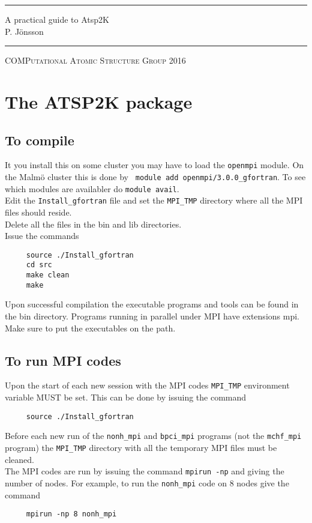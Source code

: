 \documentclass[fleqn,10pt]{book}
\newcommand{\HRule}{\rule{\linewidth}{1mm}}
\begin{document}
\HRule
\begin{flushright}
\huge A practical guide to {\sc Atsp}2K\\[7mm]
\huge P. J\"onsson\\
\end{flushright}
\HRule

\vspace{8 mm}

\begin{center}
\Large \textsc{COMPutational Atomic Structure Group 2016}
\end{center}

\clearpage



\tableofcontents 
\clearpage

\noindent
\chapter{The ATSP2K package}
\section{To compile}
It you install this on some cluster you may have to load the \verb+openmpi+ module. On the Malm\"o cluster this is done by
\verb+ module add openmpi/3.0.0_gfortran+. To see which modules are availabler do \verb+module avail+.\medskip\\
Edit the \verb+Install_gfortran+ file and set the \verb+MPI_TMP+ directory where all the MPI files should reside.\medskip\\
Delete all the files in the bin and lib directories.\medskip\\
Issue the commands
\begin{verbatim}
     source ./Install_gfortran
     cd src
     make clean
     make
\end{verbatim}
Upon successful compilation the executable programs and tools can be found in the bin directory. Programs running in parallel under MPI have extensions mpi. Make sure to put the executables on the path.
\section{To run MPI codes}
Upon the start of each new session with the MPI codes \verb+MPI_TMP+ environment variable MUST be set.
This can be done by issuing the command 
\begin{verbatim}
     source ./Install_gfortran
\end{verbatim}
Before each new run of the \verb+nonh_mpi+ and \verb+bpci_mpi+ programs (not the \verb+mchf_mpi+ program) the \verb+MPI_TMP+ directory with all the temporary MPI files must be cleaned.\medskip\\
The MPI codes are run by issuing the command \verb+mpirun -np+ and giving the number of nodes. For example,
to run the \verb+nonh_mpi+ code on 8 nodes give the command
\begin{verbatim}
     mpirun -np 8 nonh_mpi
\end{verbatim}
\end{document}
